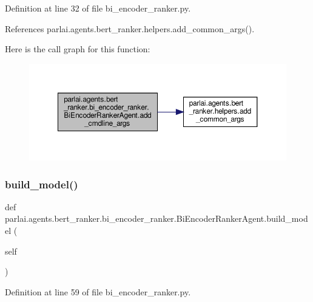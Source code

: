 Definition at line 32 of file bi\+\_\+encoder\+\_\+ranker.\+py.



References parlai.\+agents.\+bert\+\_\+ranker.\+helpers.\+add\+\_\+common\+\_\+args().

Here is the call graph for this function\+:
\nopagebreak
\begin{figure}[H]
\begin{center}
\leavevmode
\includegraphics[width=350pt]{classparlai_1_1agents_1_1bert__ranker_1_1bi__encoder__ranker_1_1BiEncoderRankerAgent_a94b0668eadb20cdd95bd5f95641fc2a6_cgraph}
\end{center}
\end{figure}
\mbox{\label{classparlai_1_1agents_1_1bert__ranker_1_1bi__encoder__ranker_1_1BiEncoderRankerAgent_a120946c26655cbb680f1e492cf4e4817}} 
\subsubsection{\texorpdfstring{build\+\_\+model()}{build\_model()}}
{\footnotesize\ttfamily def parlai.\+agents.\+bert\+\_\+ranker.\+bi\+\_\+encoder\+\_\+ranker.\+Bi\+Encoder\+Ranker\+Agent.\+build\+\_\+model (\begin{DoxyParamCaption}\item[{}]{self }\end{DoxyParamCaption})}



Definition at line 59 of file bi\+\_\+encoder\+\_\+ranker.\+py.



